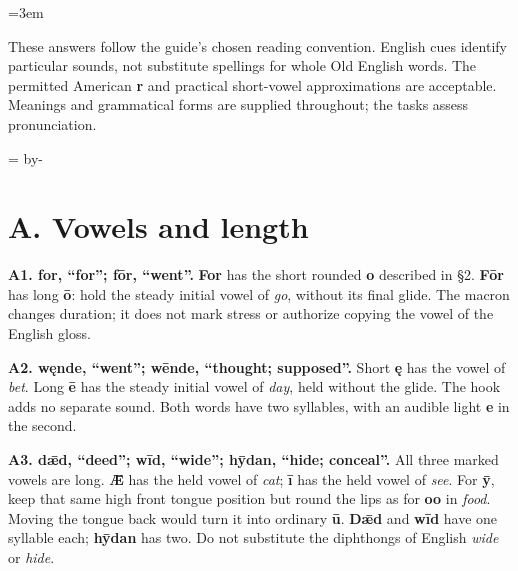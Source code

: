 \newcommand{\runningtitle}{Pronunciation key}

\emergencystretch=3em
\newcommand{\reserve}[1]{\par\penalty-100\begingroup\dimen0=\pagegoal\advance\dimen0 by-\pagetotal\ifdim\dimen0<#1\newpage\fi\endgroup}
\newcommand{\itempara}[2]{\par\addvspace{3pt}\begingroup\raggedright\noindent\hangindent=1.8em\hangafter=1\makebox[1.8em][l]{#1.}#2\par\endgroup}

\raggedright
{}

These answers follow the guide's chosen reading convention. English cues identify particular sounds, not substitute spellings for whole Old English words. The permitted American \textbf{r} and practical short-vowel approximations are acceptable. Meanings and grammatical forms are supplied throughout; the tasks assess pronunciation.

\reserve{4\baselineskip}
\section*{A. Vowels and length}

\textbf{A1. for, “for”; fōr, “went”.} \textbf{For} has the short rounded \textbf{o} described in §2. \textbf{Fōr} has long \textbf{ō}: hold the steady initial vowel of \emph{go}, without its final glide. The macron changes duration; it does not mark stress or authorize copying the vowel of the English gloss.

\textbf{A2. węnde, “went”; wēnde, “thought; supposed”.} Short \textbf{ę} has the vowel of \emph{bet}. Long \textbf{ē} has the steady initial vowel of \emph{day}, held without the glide. The hook adds no separate sound. Both words have two syllables, with an audible light \textbf{e} in the second.

\textbf{A3. dǣd, “deed”; wīd, “wide”; hȳdan, “hide; conceal”.} All three marked vowels are long. \textbf{Ǣ} has the held vowel of \emph{cat}; \textbf{ī} has the held vowel of \emph{see}. For \textbf{ȳ}, keep that same high front tongue position but round the lips as for \textbf{oo} in \emph{food}. Moving the tongue back would turn it into ordinary \textbf{ū}. \textbf{Dǣd} and \textbf{wīd} have one syllable each; \textbf{hȳdan} has two. Do not substitute the diphthongs of English \emph{wide} or \emph{hide}.

